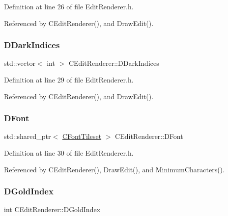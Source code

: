 Definition at line 26 of file Edit\+Renderer.\+h.



Referenced by C\+Edit\+Renderer(), and Draw\+Edit().

\hypertarget{classCEditRenderer_a6bbd6668cec64e318d5e814423bac3ca}{}\label{classCEditRenderer_a6bbd6668cec64e318d5e814423bac3ca} 
\subsubsection{\texorpdfstring{D\+Dark\+Indices}{DDarkIndices}}
{\footnotesize\ttfamily std\+::vector$<$ int $>$ C\+Edit\+Renderer\+::\+D\+Dark\+Indices\hspace{0.3cm}{\ttfamily [protected]}}



Definition at line 29 of file Edit\+Renderer.\+h.



Referenced by C\+Edit\+Renderer(), and Draw\+Edit().

\hypertarget{classCEditRenderer_afd108ae6cb3e9eeffce881a1ada0f0db}{}\label{classCEditRenderer_afd108ae6cb3e9eeffce881a1ada0f0db} 
\subsubsection{\texorpdfstring{D\+Font}{DFont}}
{\footnotesize\ttfamily std\+::shared\+\_\+ptr$<$ \hyperlink{classCFontTileset}{C\+Font\+Tileset} $>$ C\+Edit\+Renderer\+::\+D\+Font\hspace{0.3cm}{\ttfamily [protected]}}



Definition at line 30 of file Edit\+Renderer.\+h.



Referenced by C\+Edit\+Renderer(), Draw\+Edit(), and Minimum\+Characters().

\hypertarget{classCEditRenderer_adef6e0cd1cc67b18a196bbac95a7306b}{}\label{classCEditRenderer_adef6e0cd1cc67b18a196bbac95a7306b} 
\subsubsection{\texorpdfstring{D\+Gold\+Index}{DGoldIndex}}
{\footnotesize\ttfamily int C\+Edit\+Renderer\+::\+D\+Gold\+Index\hspace{0.3cm}{\ttfamily [protected]}}



